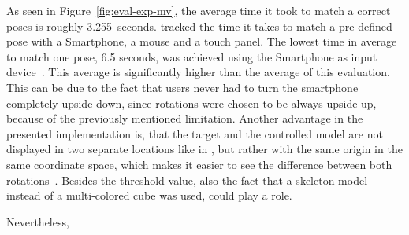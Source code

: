 \newcommand{\evalExpMvAvgPoses}{3.255} %
As seen in Figure~\ref{fig:eval-exp-mv}, the average time it took to match a correct poses is roughly \evalExpMvAvgPoses\ seconds. \citeauthor{Katzakis.2010} tracked the time it takes to match a pre-defined pose with a Smartphone, a mouse and a touch panel. The lowest time in average to match one pose, 6.5 seconds, was achieved using the Smartphone as input device~\cite[140]{Katzakis.2010}. This average is significantly higher than the average of this evaluation. This can be due to the fact that users never had to turn the smartphone completely upside down, since rotations were chosen to be always upside up, because of the previously mentioned limitation. Another advantage in the presented implementation is, that the target and the controlled model are not displayed in two separate locations like in {}, but rather with the same origin in the same coordinate space, which makes it easier to see the difference between both rotations~\cite[140]{Katzakis.2010}. Besides the threshold value, also the fact that a skeleton model instead of a multi-colored cube was used, could play a role. 

Nevertheless, 


